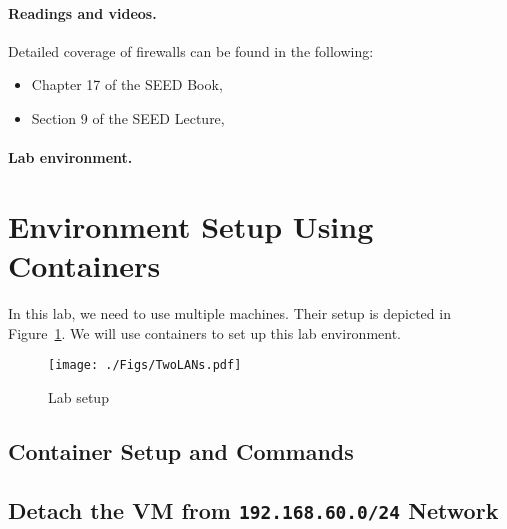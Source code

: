 \paragraph{Readings and videos.}
Detailed coverage of firewalls can be found in the following:

\begin{itemize}
\item Chapter 17 of the SEED Book, \seedbook
\item Section 9 of the SEED Lecture, \seedisvideo
\end{itemize}


\paragraph{Lab environment.} \seedenvironmentB




\section{Environment Setup Using Containers}


In this lab, we need to use multiple machines. 
Their setup is depicted in Figure~\ref{fig:labsetup}.  
We will use containers to set up this lab environment.


\begin{figure}[htb]
\begin{center}
\texttt{[image: ./Figs/TwoLANs.pdf]}
\end{center}
\caption{Lab setup}
\label{fig:labsetup}
\end{figure}


\subsection{Container Setup and Commands}




\subsection{Detach the VM from \texttt{192.168.60.0/24} Network} 




